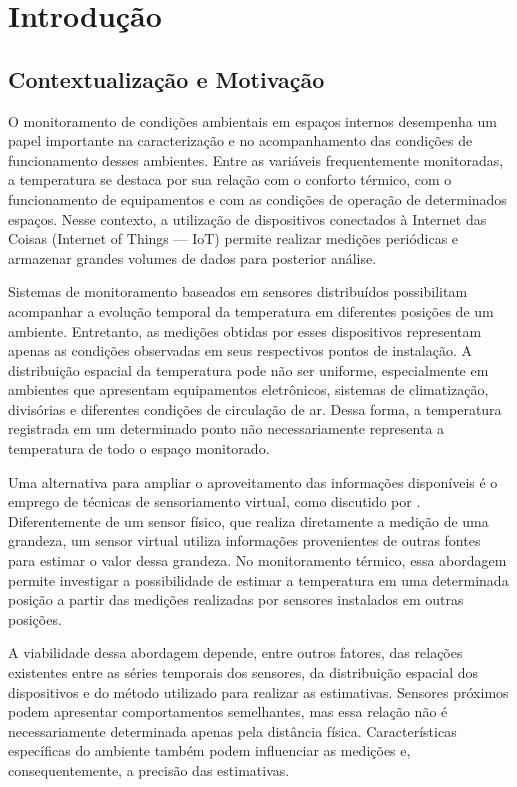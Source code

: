 \chapter{Introdução}
\label{sec:introducao}

\section{Contextualização e Motivação}
O monitoramento de condições ambientais em espaços internos desempenha um papel importante na caracterização e no acompanhamento das condições de funcionamento desses ambientes. Entre as variáveis frequentemente monitoradas, a temperatura se destaca por sua relação com o conforto térmico, com o funcionamento de equipamentos e com as condições de operação de determinados espaços. Nesse contexto, a utilização de dispositivos conectados à Internet das Coisas (Internet of Things — IoT) permite realizar medições periódicas e armazenar grandes volumes de dados para posterior análise.

Sistemas de monitoramento baseados em sensores distribuídos possibilitam acompanhar a evolução temporal da temperatura em diferentes posições de um ambiente. Entretanto, as medições obtidas por esses dispositivos representam apenas as condições observadas em seus respectivos pontos de instalação. A distribuição espacial da temperatura pode não ser uniforme, especialmente em ambientes que apresentam equipamentos eletrônicos, sistemas de climatização, divisórias e diferentes condições de circulação de ar. Dessa forma, a temperatura registrada em um determinado ponto não necessariamente representa a temperatura de todo o espaço monitorado.

Uma alternativa para ampliar o aproveitamento das informações disponíveis é o emprego de técnicas de sensoriamento virtual, como discutido por . Diferentemente de um sensor físico, que realiza diretamente a medição de uma grandeza, um sensor virtual utiliza informações provenientes de outras fontes para estimar o valor dessa grandeza. No monitoramento térmico, essa abordagem permite investigar a possibilidade de estimar a temperatura em uma determinada posição a partir das medições realizadas por sensores instalados em outras posições.

A viabilidade dessa abordagem depende, entre outros fatores, das relações existentes entre as séries temporais dos sensores, da distribuição espacial dos dispositivos e do método utilizado para realizar as estimativas. Sensores próximos podem apresentar comportamentos semelhantes, mas essa relação não é necessariamente determinada apenas pela distância física. Características específicas do ambiente também podem influenciar as medições e, consequentemente, a precisão das estimativas.

